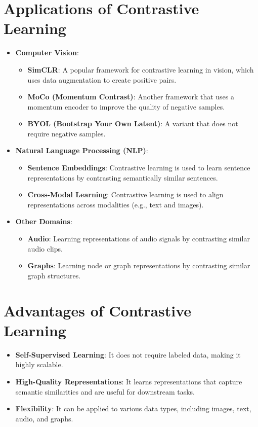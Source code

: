 \begin{notechapter}
\section{Applications of Contrastive Learning}
\begin{itemize}
    \item \textbf{Computer Vision}:
          \begin{itemize}
              \item \textbf{SimCLR}: A popular framework for 
                    contrastive learning in vision, which uses data 
                    augmentation to create positive pairs.
              \item \textbf{MoCo (Momentum Contrast)}: Another framework 
                    that uses a momentum encoder to improve the quality 
                    of negative samples.
              \item \textbf{BYOL (Bootstrap Your Own Latent)}: A variant 
                    that does not require negative samples.
          \end{itemize}
    \item \textbf{Natural Language Processing (NLP)}:
          \begin{itemize}
              \item \textbf{Sentence Embeddings}: Contrastive learning 
                    is used to learn sentence representations by 
                    contrasting semantically similar sentences.
              \item \textbf{Cross-Modal Learning}: Contrastive learning 
                    is used to align representations across modalities 
                    (e.g., text and images).
          \end{itemize}
    \item \textbf{Other Domains}:
          \begin{itemize}
              \item \textbf{Audio}: Learning representations of audio 
                    signals by contrasting similar audio clips.
              \item \textbf{Graphs}: Learning node or graph 
                    representations by contrasting similar graph 
                    structures.
          \end{itemize}
\end{itemize}

\section{Advantages of Contrastive Learning}
\begin{itemize}
    \item \textbf{Self-Supervised Learning}: It does not require labeled 
          data, making it highly scalable.
    \item \textbf{High-Quality Representations}: It learns 
          representations that capture semantic similarities and are 
          useful for downstream tasks.
    \item \textbf{Flexibility}: It can be applied to various data types, 
          including images, text, audio, and graphs.
\end{itemize}


\end{notechapter}
